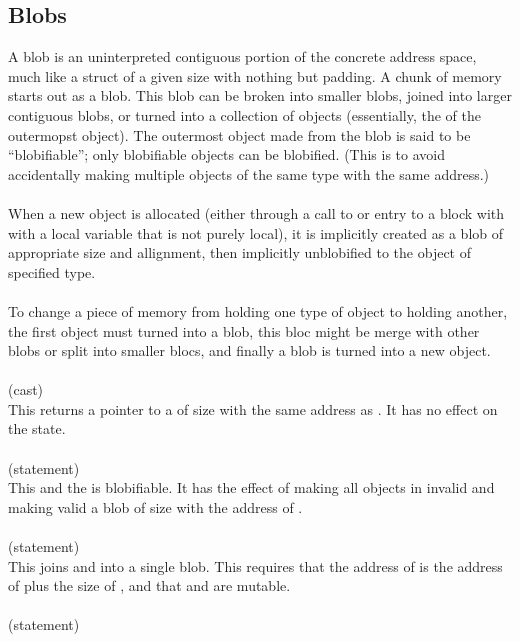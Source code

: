 \documentclass[preprint,nocopyrightspace]{sigplanconf}
\begin{document}
{{{\subsection{Blobs}
A blob is an uninterpreted contiguous portion of the concrete address
space, much like a struct of a given size with nothing but padding. 
A chunk of memory starts out as a blob. This blob can be broken into
smaller blobs, joined into larger contiguous blobs, or turned into a
collection of objects (essentially, the  of the outermopst
object). The outermost object made from the blob is said to be
``blobifiable''; only blobifiable objects can be blobified. (This is
to avoid accidentally making multiple objects of the same type with
the same address.) 
\\\\
When a new object is allocated (either through a call to  or
entry to a block with with a local variable that is not purely local),
it is implicitly created as a blob of appropriate size and allignment,
then implicitly unblobified to the object of specified type.
\\\\
To change a piece of memory from holding one type of object to holding
another, the first object must turned into a blob, this bloc might be 
merge with other blobs or split into smaller blocs, and finally a blob
is turned into a new object. 
\\\\
 (cast)\\
This returns a pointer to a  of size  with the same
address as . It has no effect on the state. 
\\\\
 (statement)\\
This    and
the \vcc{\object} is blobifiable. It has the effect of making all
objects in  invalid and making valid a blob of
size  with the address of .
\\\\ 
 (statement)\\
This joins  and  into a single blob. This requires that
the address of  is the address of  plus the size
of , and that  and  are mutable.
\\\\
 (statement)\\
}}}
\end{document}
